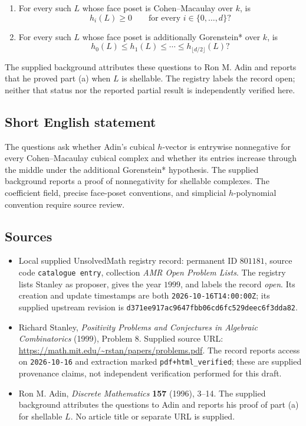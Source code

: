 \documentclass[11pt]{article}
\begin{document}
\begin{enumerate}
\item[(a)] For every such \(L\) whose face poset is Cohen--Macaulay over \(k\), is
\[
h_i(L)\geq 0\qquad\text{for every }i\in\{0,\ldots,d\}?
\]
\item[(b)] For every such \(L\) whose face poset is additionally Gorenstein* over \(k\), is
\[
h_0(L)\leq h_1(L)\leq\cdots\leq h_{\lfloor d/2\rfloor}(L)?
\]
\end{enumerate}
The supplied background attributes these questions to Ron M. Adin and reports that he proved part (a) when \(L\) is shellable. The registry labels the record open; neither that status nor the reported partial result is independently verified here.
\subsection{Short English statement}
The questions ask whether Adin's cubical \(h\)-vector is entrywise nonnegative for every Cohen--Macaulay cubical complex and whether its entries increase through the middle under the additional Gorenstein* hypothesis. The supplied background reports a proof of nonnegativity for shellable complexes. The coefficient field, precise face-poset conventions, and simplicial \(h\)-polynomial convention require source review.
\subsection{Sources}
\begin{itemize}
\item Local supplied UnsolvedMath registry record: permanent ID \(801181\), source code \texttt{catalogue entry}, collection \emph{AMR Open Problem Lists}. The registry lists Stanley as proposer, gives the year \(1999\), and labels the record \emph{open}. Its creation and update timestamps are both \texttt{2026-10-16T14:00:00Z}; its supplied upstream revision is \texttt{d371ee917ac9647fbb06cd6fc529deec6f3dda82}.
\item Richard Stanley, \emph{Positivity Problems and Conjectures in Algebraic Combinatorics} (1999), Problem 8. Supplied source URL: \url{https://math.mit.edu/~rstan/papers/problems.pdf}. The record reports access on \texttt{2026-10-16} and extraction marked \texttt{pdf+html\_verified}; these are supplied provenance claims, not independent verification performed for this draft.
\item Ron M. Adin, \emph{Discrete Mathematics} \textbf{157} (1996), 3--14. The supplied background attributes the questions to Adin and reports his proof of part (a) for shellable \(L\). No article title or separate URL is supplied.
\end{itemize}
\end{document}
